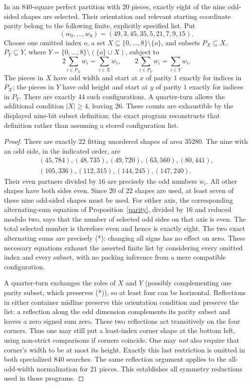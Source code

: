 \documentclass[11pt]{article}
\begin{document}
\begin{proposition}\label{twenty}
In an $840$-square perfect partition with $20$ pieces, exactly eight of the
nine odd-sided shapes are selected. Their orientation and relevant starting
coordinate parity belong to the following finite, explicitly specified list.
Put
\[
 (w_0,\ldots,w_8)=(49,3,45,35,5,21,7,9,15).
\]
Choose one omitted index $o$, a set $X\subseteq\{0,\ldots,8\}\setminus\{o\}$,
and subsets $P_X\subseteq X$, $P_Y\subseteq Y$, where
$Y=\{0,\ldots,8\}\setminus(\{o\}\cup X)$, subject to
\[
 2\sum_{i\in P_X}w_i=\sum_{i\in X}w_i,\qquad
 2\sum_{i\in P_Y}w_i=\sum_{i\in Y}w_i.                 \tag{*}
\]
The pieces in $X$ have odd width and start at $x$ of parity $1$ exactly for
indices in $P_X$; the pieces in $Y$ have odd height and start at $y$ of parity
$1$ exactly for indices in $P_Y$. There are exactly $44$ such configurations.
A quarter-turn allows the additional condition $|X|\ge4$, leaving $26$.
These counts are exhaustible by the displayed nine-bit subset definition;
the exact program reconstructs that definition rather than assuming a stored
configuration list.
\end{proposition}
\begin{proof}
There are exactly $22$ fitting unordered shapes of area $35280$. The nine
with an odd side, in the indicated order, are
\[
\begin{gathered}
(45,784),(48,735),(49,720),(63,560),(80,441),\\
(105,336),(112,315),(144,245),(147,240).
\end{gathered}
\]
Their even partners divided by $16$ are precisely the odd numbers $w_i$.
All other shapes have both sides even. Since $20$ of $22$ shapes are used,
at least seven of these nine odd-sided shapes must be used. For either axis,
the corresponding alternating-sum equation of Proposition~\ref{parity}, divided
by $16$ and reduced modulo two, says that the number of selected odd sides
on that axis is even. The total selected number is therefore even and hence
is exactly eight. The two exact alternating sums are precisely (*): changing
all signs has no effect on zero. These necessary equations exhaust the asserted
finite list by considering every omitted index and every subset, with no
packing inference from a mere compatible configuration.

A quarter-turn exchanges the roles of $X$ and $Y$ (possibly complementing
one parity subset, which preserves (*)), so at least four can be horizontal.
Reflections in either container midline preserve this orientation condition
and preserve the list: a reflection along the odd dimension complements its
parity subset and leaves a zero signed sum zero. These two reflections act
transitively on the four corners. Thus one may still put a least-index corner
shape at the bottom left, using non-strict comparisons if corners coincide.
One may \emph{not} also require that corner's width to be at most its height.
Exactly this last restriction is omitted in both specialized $840$ searches.
The same reflection argument applies to the all-odd-width normalization for
$21$ pieces. This establishes all symmetry reductions used in those programs.
\end{proof}
\end{document}
